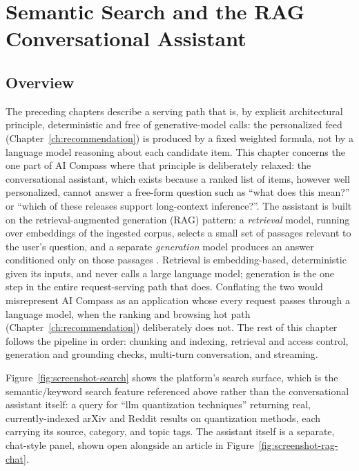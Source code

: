 \chapter{Semantic Search and the RAG Conversational Assistant}
\label{chap:rag}

\section{Overview}
\label{sec:rag-overview}

The preceding chapters describe a serving path that is, by explicit architectural principle, deterministic and free of generative-model calls: the personalized feed (Chapter~\ref{ch:recommendation}) is produced by a fixed weighted formula, not by a language model reasoning about each candidate item. This chapter concerns the one part of AI Compass where that principle is deliberately relaxed: the conversational assistant, which exists because a ranked list of items, however well personalized, cannot answer a free-form question such as ``what does this mean?'' or ``which of these releases support long-context inference?''. The assistant is built on the retrieval-augmented generation (RAG) pattern: a \emph{retrieval} model, running over embeddings of the ingested corpus, selects a small set of passages relevant to the user's question, and a separate \emph{generation} model produces an answer conditioned only on those passages \cite{lewis2020rag}. Retrieval is embedding-based, deterministic given its inputs, and never calls a large language model; generation is the one step in the entire request-serving path that does. Conflating the two would misrepresent AI Compass as an application whose every request passes through a language model, when the ranking and browsing hot path (Chapter~\ref{ch:recommendation}) deliberately does not. The rest of this chapter follows the pipeline in order: chunking and indexing, retrieval and access control, generation and grounding checks, multi-turn conversation, and streaming.

Figure~\ref{fig:screenshot-search} shows the platform's search surface, which is the semantic/keyword search feature referenced above rather than the conversational assistant itself: a query for ``llm quantization techniques'' returning real, currently-indexed arXiv and Reddit results on quantization methods, each carrying its source, category, and topic tags. The assistant itself is a separate, chat-style panel, shown open alongside an article in Figure~\ref{fig:screenshot-rag-chat}.

